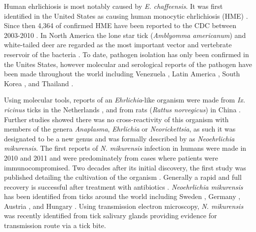 \documentclass[a4paper, nobind]{templates/ociamthesis}
\begin{document}
Human ehrlichiosis is most notably caused by \emph{E. chaffeensis}.
It was first identified in the United States as causing human monocytic ehrlichiosis (HME) \autocite{andersonEhrlichiaChaffeensisNew1991}.
Since then 4,364 of confirmed HME have been reported to the CDC between 2003-2010 \autocite{mmwrFinal2009Reports2010}.
In North America the lone star tick (\emph{Amblyomma americanum}) and white-tailed deer are regarded as the most important vector and vertebrate reservoir of the bacteria \autocite{rarAnaplasmaEhrlichiaCandidatus2011}.
To date, pathogen isolation has only been confirmed in the Unites States, however molecular and serological reports of the pathogen have been made throughout the world including Venezuela \autocite{martinezEhrlichiaChaffeensisChild2008}, Latin America \autocite{gongora-biachiFirstCaseHuman1999,dacostaMoreHumanMonocytotropic2006}, South Korea \autocite{parkDetectionAntibodiesAnaplasma2003}, and Thailand \autocite{heppnerHumanEhrlichiosisThailand1997}.

Using molecular tools, reports of an \emph{Ehrlichia}-like organism were made from \emph{Ix. ricinus} ticks in the Netherlands \autocite{schoulsDetectionIdentificationEhrlichia1999}, and from rats (\emph{Rattus norvegicus}) in China \autocite{panEhrlichialikeOrganismGene2003}.
Further studies showed there was no cross-reactivity of this organism with members of the genera \emph{Anaplasma}, \emph{Ehrlichia} or \emph{Neorickettsia}, as such it was designated to be a new genus and was formally described by \textcite{kawaharaUltrastructurePhylogeneticAnalysis2004} as \emph{Neoehrlichia mikurensis}. The first reports of \emph{N. mikurensis} infection in humans were made in 2010 and 2011 \autocite{fehrSepticemiaCausedTickborne2010,vonloewenichDetectionCandidatusNeoehrlichia2010,welinder-olssonFirstCaseHuman2010,pekovaCandidatusNeoehrlichiaMikurensis2011} and were predominately from cases where patients were immunocompromised.
Two decades after its initial discovery, the first study was published detailing the cultivation of the organism \autocite{wassCultivationCausativeAgent2019}.
Generally a rapid and full recovery is successful after treatment with antibiotics \autocite{pekovaCandidatusNeoehrlichiaMikurensis2011}.
\emph{Neoehrlichia mikurensis} has been identified from ticks around the world including Sweden \autocite{anderssonCoinfectionCandidatusNeoehrlichia2013}, Germany \autocite{dinizCandidatusNeoehrlichiaMikurensis2011}, Austria \autocite{glatzDetectionCandidatusNeoehrlichia2014}, and Hungary \autocite{hornokMolecularAnalysisIxodes2017}.
Using transmission electron microscopy, \emph{N. mikurensis} was recently identified from tick salivary glands \autocite{ondrusPutativeMorphologyNeoehrlichia2020} providing evidence for transmission route via a tick bite.
\end{document}
